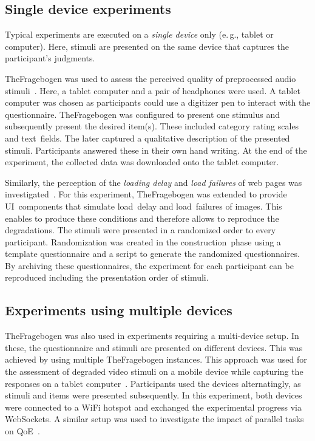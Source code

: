 \documentclass[conference,a4paper]{IEEEtran}
\newcommand{\eg}{e.\,g.}
\begin{document}
\subsection{Single device experiments}
Typical experiments are executed on a \emph{single device} only (\eg, tablet or computer).
Here, stimuli are presented on the same device that captures the participant's judgments.

TheFragebogen was used to assess the perceived quality of preprocessed audio stimuli~\cite{guse_duration_2016}.
Here, a tablet computer and a pair of headphones were used.
A tablet computer was chosen as participants could use a digitizer pen to interact with the questionnaire.
TheFragebogen was configured to present one stimulus and subsequently present the desired item(s).
These included category rating scales and text~fields. The later captured a qualitative description of the presented stimuli.
Participants answered these in their own hand writing.
At the end of the experiment, the collected data was downloaded onto the tablet computer.

Similarly, the perception of the \emph{loading delay} and \emph{load failures} of web pages was investigated~\cite{guse_subjective_2015}.
For this experiment, TheFragebogen was extended to provide UI~components that simulate load~delay and load~failures of images.
This enables to produce these conditions and therefore allows to reproduce the degradations.
The stimuli were presented in a randomized order to every participant.
Randomization was created in the construction~phase using a template questionnaire and a script to generate the randomized questionnaires.
By archiving these questionnaires, the experiment for each participant can be reproduced including the presentation order of stimuli.

\subsection{Experiments using multiple devices}
TheFragebogen was also used in experiments requiring a multi-device setup.
In these, the questionnaire and stimuli are presented on different devices.
This was achieved by using multiple TheFragebogen instances.
This approach was used for the assessment of degraded video stimuli on a mobile device while capturing the responses on a tablet computer~\cite[p.\,42ff.]{guse_multi-episodic_2016}.
Participants used the devices alternatingly, as stimuli and items were presented subsequently.
In this experiment, both devices were connected to a WiFi hotspot and exchanged the experimental progress via WebSockets.
A similar setup was used to investigate the impact of parallel tasks on QoE~\cite{guse_web-qoe_2014}.
\end{document}
